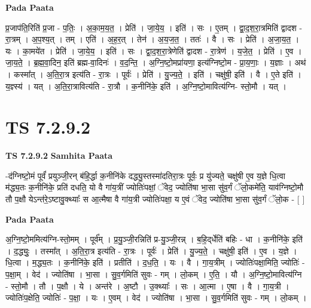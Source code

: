 \documentclass[17pt]{extarticle}
\begin{document}
\textbf{Pada Paata} \newline

प्र॒जाप॑ति॒रिति॑ प्र॒जा - प॒तिः॒ । अ॒का॒म॒य॒त॒ । प्रेति॑ । जा॒ये॒य॒ । इति॑ । सः । ए॒तम् । द्वा॒द॒श॒रा॒त्रमिति॑ द्वादश - रा॒त्रम् । अ॒प॒श्य॒त् । तम् । एति॑ । अ॒ह॒र॒त् । तेन॑ । अ॒य॒ज॒त॒ । ततः॑ । वै । सः । प्रेति॑ । अ॒जा॒य॒त॒ । यः । का॒मये॑त । प्रेति॑ । जा॒ये॒य॒ । इति॑ । सः । द्वा॒द॒श॒रा॒त्रेणेति॑ द्वादश - रा॒त्रेण॑ । य॒जे॒त॒ । प्रेति॑ । ए॒व । जा॒य॒ते॒ । ब्र॒ह्म॒वा॒दिन॒ इति॑ ब्रह्म-वा॒दिनः॑ । व॒द॒न्ति॒ । अ॒ग्नि॒ष्टो॒मप्रा॑यणा॒ इत्य॑ग्निष्टो॒म - प्रा॒य॒णाः॒ । य॒ज्ञाः । अथ॑ । कस्मा᳚त् । अ॒ति॒रा॒त्र इत्य॑ति - रा॒त्रः । पूर्वः॑ । प्रेति॑ । यु॒ज्य॒ते॒ । इति॑ । चक्षु॑षी॒ इति॑ । वै । ए॒ते इति॑ । य॒ज्ञ्स्य॑ । यत् । अ॒ति॒रा॒त्रावित्य॑ति - रा॒त्रौ । क॒नीनि॑के॒ इति॑ । अ॒ग्नि॒ष्टो॒मावित्य॑ग्नि- स्तो॒मौ । यत् ।  \newline




\section*{ TS 7.2.9.2 }

\textbf{TS 7.2.9.2 } \newline
\textbf{Samhita Paata} \newline

-द॑ग्निष्टो॒मं पूर्वं॑ प्रयुञ्जी॒रन् ब॑हि॒र्द्धा क॒नीनि॑के दद्ध्यु॒स्तस्मा॑दतिरा॒त्रः पूर्वः॒ प्र यु॑ज्यते॒ चक्षु॑षी ए॒व य॒ज्ञे धि॒त्वा म॑द्ध्य॒तः क॒नीनि॑के॒ प्रति॑ दधति॒ यो वै गा॑य॒त्रीं ज्योतिः॑पक्षां॒ ॅवेद॒ ज्योति॑षा भा॒सा सु॑व॒र्गं ॅलो॒कमे॑ति॒ याव॑ग्निष्टो॒मौ तौ प॒क्षौ येऽन्त॑रे॒ऽष्टावु॒क्थ्याः᳚ स आ॒त्मैषा वै गा॑य॒त्री ज्योतिः॑पक्षा॒ य ए॒वं ॅवेद॒ ज्योति॑षा भा॒सा सु॑व॒र्गं ॅलो॒क - [  ] \newline

\textbf{Pada Paata} \newline

अ॒ग्नि॒ष्टो॒ममित्य॑ग्नि-स्तो॒मम् । पूर्व᳚म् । प्र॒यु॒ञ्जी॒रन्निति॑ प्र-यु॒ञ्जी॒रन्न् । ब॒हि॒द्‌र्धेति॑ बहिः - धा । क॒नीनि॑के॒ इति॑ । द॒द्ध्युः॒ । तस्मा᳚त् । अ॒ति॒रा॒त्र इत्य॑ति - रा॒त्रः । पूर्वः॑ । प्रेति॑ । यु॒ज्य॒ते॒ । चक्षु॑षी॒ इति॑ । ए॒व । य॒ज्ञे । धि॒त्वा । म॒द्ध्य॒तः । क॒नीनि॑के॒ इति॑ । प्रतीति॑ । द॒ध॒ति॒ । यः । वै । गा॒य॒त्रीम् । ज्योतिः॑पक्षा॒मिति॒ ज्योतिः॑ - प॒क्षा॒म् । वेद॑ । ज्योति॑षा । भा॒सा । सु॒व॒र्गमिति॑ सुवः - गम् । लो॒कम् । ए॒ति॒ । यौ । अ॒ग्नि॒ष्टो॒मावित्य॑ग्नि - स्तो॒मौ । तौ । प॒क्षौ । ये । अन्त॑रे । अ॒ष्टौ । उ॒क्थ्याः᳚ । सः । आ॒त्मा । ए॒षा । वै । गा॒य॒त्री । ज्योतिः॑प॒क्षेति॒ ज्योतिः॑ - प॒क्षा॒ । यः । ए॒वम् । वेद॑ । ज्योति॑षा । भा॒सा । सु॒व॒र्गमिति॑ सुवः - गम् । लो॒कम् ।  \newline
\end{document}

